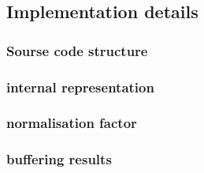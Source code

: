 

\subsection{Implementation details}

\subsubsection{Sourse code structure}

\subsubsection{internal representation}

\subsubsection{normalisation factor}

\subsubsection{buffering results}
